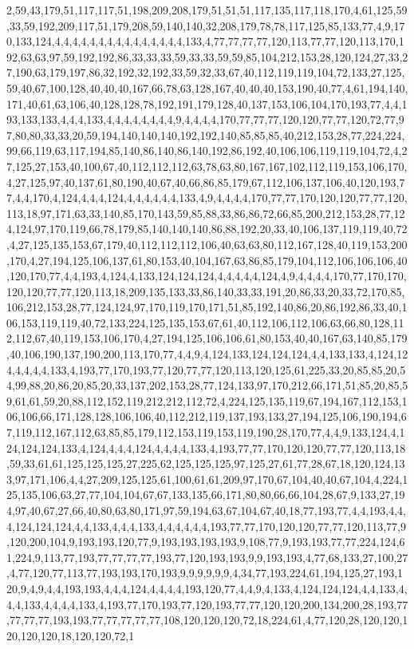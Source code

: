 2,59,43,179,51,117,117,51,198,209,208,179,51,51,51,117,135,117,118,170,4,61,125,59,33,59,192,209,117,51,179,208,59,140,140,32,208,179,78,78,117,125,85,133,77,4,9,170,133,124,4,4,4,4,4,4,4,4,4,4,4,4,4,4,4,133,4,77,77,77,77,120,113,77,77,120,113,170,192,63,63,97,59,192,192,86,33,33,33,59,33,33,59,59,85,104,212,153,28,120,124,27,33,27,190,63,179,197,86,32,192,32,192,33,59,32,33,67,40,112,119,119,104,72,133,27,125,59,40,67,100,128,40,40,40,167,66,78,63,128,167,40,40,40,153,190,40,77,4,61,194,140,171,40,61,63,106,40,128,128,78,192,191,179,128,40,137,153,106,104,170,193,77,4,4,193,133,133,4,4,4,133,4,4,4,4,4,4,4,4,9,4,4,4,4,170,77,77,77,120,120,77,77,120,72,77,97,80,80,33,33,20,59,194,140,140,140,192,192,140,85,85,85,40,212,153,28,77,224,224,99,66,119,63,117,194,85,140,86,140,86,140,192,86,192,40,106,106,119,119,104,72,4,27,125,27,153,40,100,67,40,112,112,112,63,78,63,80,167,167,102,112,119,153,106,170,4,27,125,97,40,137,61,80,190,40,67,40,66,86,85,179,67,112,106,137,106,40,120,193,77,4,4,170,4,124,4,4,4,124,4,4,4,4,4,4,133,4,9,4,4,4,4,170,77,77,170,120,120,77,77,120,113,18,97,171,63,33,140,85,170,143,59,85,88,33,86,86,72,66,85,200,212,153,28,77,124,124,97,170,119,66,78,179,85,140,140,140,86,88,192,20,33,40,106,137,119,119,40,72,4,27,125,135,153,67,179,40,112,112,112,106,40,63,63,80,112,167,128,40,119,153,200,170,4,27,194,125,106,137,61,80,153,40,104,167,63,86,85,179,104,112,106,106,106,40,120,170,77,4,4,193,4,124,4,133,124,124,124,4,4,4,4,4,124,4,9,4,4,4,4,170,77,170,170,120,120,77,77,120,113,18,209,135,133,33,86,140,33,33,191,20,86,33,20,33,72,170,85,106,212,153,28,77,124,124,97,170,119,170,171,51,85,192,140,86,20,86,192,86,33,40,106,153,119,119,40,72,133,224,125,135,153,67,61,40,112,106,112,106,63,66,80,128,112,112,67,40,119,153,106,170,4,27,194,125,106,106,61,80,153,40,40,167,63,140,85,179,40,106,190,137,190,200,113,170,77,4,4,9,4,124,133,124,124,124,4,4,133,133,4,124,124,4,4,4,4,133,4,193,77,170,193,77,120,77,77,120,113,120,125,61,225,33,20,85,85,20,54,99,88,20,86,20,85,20,33,137,202,153,28,77,124,133,97,170,212,66,171,51,85,20,85,59,61,61,59,20,88,112,152,119,212,212,112,72,4,224,125,135,119,67,194,167,112,153,106,106,66,171,128,128,106,106,40,112,212,119,137,193,133,27,194,125,106,190,194,67,119,112,167,112,63,85,85,179,112,153,119,153,119,190,28,170,77,4,4,9,133,124,4,124,124,124,133,4,124,4,4,4,124,4,4,4,4,133,4,193,77,77,170,120,120,77,77,120,113,18,59,33,61,61,125,125,125,27,225,62,125,125,125,97,125,27,61,77,28,67,18,120,124,133,97,171,106,4,4,27,209,125,125,61,100,61,61,209,97,170,67,104,40,40,67,104,4,224,125,135,106,63,27,77,104,104,67,67,133,135,66,171,80,80,66,66,104,28,67,9,133,27,194,97,40,67,27,66,40,80,63,80,171,97,59,194,63,67,104,67,40,18,77,193,77,4,4,193,4,4,4,124,124,124,4,4,133,4,4,4,133,4,4,4,4,4,4,193,77,77,170,120,120,77,77,120,113,77,9,120,200,104,9,193,193,120,77,9,193,193,193,193,9,108,77,9,193,193,77,77,224,124,61,224,9,113,77,193,77,77,77,77,193,77,120,193,193,9,9,193,193,4,77,68,133,27,100,27,4,77,120,77,113,77,193,193,170,193,9,9,9,9,9,9,4,34,77,193,224,61,194,125,27,193,120,9,4,9,4,4,193,193,4,4,4,124,4,4,4,4,193,120,77,4,4,9,4,133,4,124,124,124,4,4,133,4,4,4,133,4,4,4,4,133,4,193,77,170,193,77,120,193,77,77,120,120,200,134,200,28,193,77,77,77,77,193,193,77,77,77,77,77,108,120,120,120,72,18,224,61,4,77,120,28,120,120,120,120,120,18,120,120,72,1